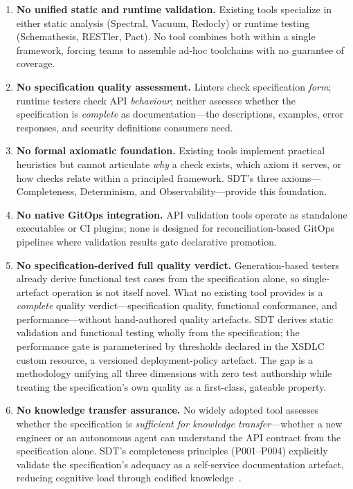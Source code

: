 \begin{enumerate}
  \item \textbf{No unified static and runtime validation.} Existing tools specialize in either static analysis (Spectral, Vacuum, Redocly) or runtime testing (Schemathesis, RESTler, Pact). No tool combines both within a single framework, forcing teams to assemble ad-hoc toolchains with no guarantee of coverage.

  \item \textbf{No specification quality assessment.} Linters check specification \textit{form}; runtime testers check API \textit{behaviour}; neither assesses whether the specification is \textit{complete} as documentation---the descriptions, examples, error responses, and security definitions consumers need.

  \item \textbf{No formal axiomatic foundation.} Existing tools implement practical heuristics but cannot articulate \textit{why} a check exists, which axiom it serves, or how checks relate within a principled framework. SDT's three axioms---Completeness, Determinism, and Observability---provide this foundation.

  \item \textbf{No native GitOps integration.} API validation tools operate as standalone executables or CI plugins; none is designed for reconciliation-based GitOps pipelines where validation results gate declarative promotion.

  \item \textbf{No specification-derived full quality verdict.} Generation-based testers already derive functional test cases from the specification alone, so single-artefact operation is not itself novel. What no existing tool provides is a \emph{complete} quality verdict---specification quality, functional conformance, and performance---without hand-authored quality artefacts. SDT derives static validation and functional testing wholly from the specification; the performance gate is parameterised by thresholds declared in the XSDLC custom resource, a versioned deployment-policy artefact. The gap is a methodology unifying all three dimensions with zero test authorship while treating the specification's own quality as a first-class, gateable property.

  \item \textbf{No knowledge transfer assurance.} No widely adopted tool assesses whether the specification is \textit{sufficient for knowledge transfer}---whether a new engineer or an autonomous agent can understand the API contract from the specification alone. SDT's completeness principles (P001--P004) explicitly validate the specification's adequacy as a self-service documentation artefact, reducing cognitive load through codified knowledge~\cite{team-topologies, nonaka-knowledge}.


\end{enumerate}
